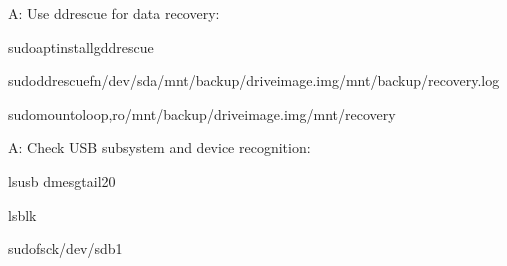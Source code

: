 \documentclass[letterpaper,10pt,english]{sphinxmanual}
\begin{document}
\sphinxAtStartPar
{}

\sphinxAtStartPar
A: Use ddrescue for data recovery:

\begin{sphinxVerbatim}[commandchars=\\\{\}]
sudoaptinstallgddrescue

sudoddrescue\PYGZhy{}f\PYGZhy{}n/dev/sda/mnt/backup/drive\PYGZus{}image.img/mnt/backup/recovery.log

sudomount\PYGZhy{}oloop,ro/mnt/backup/drive\PYGZus{}image.img/mnt/recovery
\end{sphinxVerbatim}

\sphinxAtStartPar
{}

\sphinxAtStartPar
A: Check USB subsystem and device recognition:

\begin{sphinxVerbatim}[commandchars=\\\{\}]
lsusb
dmesgtail\PYGZhy{}20

lsblk

sudofsck/dev/sdb1
\end{sphinxVerbatim}
\end{document}
